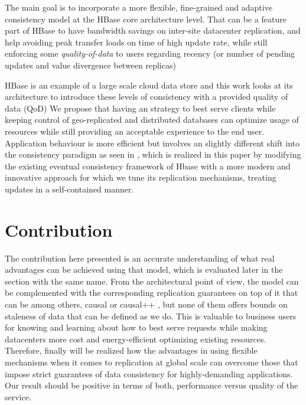 The main goal is to incorporate a more flexible, fine-grained and adaptive consistency model at the HBase core architecture level. That can be a feature part of HBase to have bandwidth savings on inter-site datacenter replication, and help avoiding peak transfer loads on time of high update rate, while still enforcing some \emph{quality-of-data} to users regarding recency (or number of pending updates and value divergence between replicas)

HBase is an example of a large scale cloud data store and this work looks at its architecture to introduce these levels of consistency with a provided quality of data (QoD) We propose that having an strategy to best serve clients while keeping control of geo-replicated and distributed databases can optimize usage of resources while still providing an acceptable experience to the end user. Application behaviour is more efficient but involves an slightly different shift into the consistency paradigm as seen in \cite{Cooper:2008}, which is realized in this paper by modifying the existing eventual consistency framework of Hbase with a more modern and innovative approach for which we tune its replication mechanisms, treating updates in a self-contained manner. 



\section{Contribution}
The contribution here presented is an accurate understanding of what real advantages can be achieved using that model, which is evaluated later in the section with the same name.  From the architectural point of view, the model can be complemented with the corresponding replication guarantees on top of it that can be among others, causal or causal++ , but none of them offers bounds on staleness of data that can be defined as we do. This is valuable to business users for knowing and learning about how to best serve requests while making datacenters more cost and energy-efficient optimizing existing resources. Therefore, finally will be realized how the advantages in using flexible mechanisms when it comes to replication at global scale can overcome those that impose strict guarantees of data consistency for highly-demanding applications. Our result should be positive in terms of both, performance versus quality of the service.

